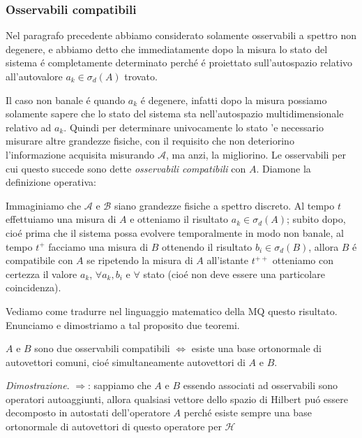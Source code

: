 \subsubsection{Osservabili compatibili}
	
Nel paragrafo precedente abbiamo considerato solamente osservabili a spettro non degenere, e abbiamo detto che immediatamente dopo la misura lo stato del sistema \'e completamente determinato perch\'e \'e proiettato sull'autospazio relativo all'autovalore $a_k \in \sigma_{d}(A)$ trovato.

Il caso non banale \'e quando $a_k$ \'e degenere, infatti dopo la misura possiamo solamente sapere che lo stato del sistema sta nell'autospazio multidimensionale relativo ad $a_k$. Quindi per determinare univocamente lo stato 'e necessario misurare altre grandezze fisiche, con il requisito che non deteriorino l'informazione acquisita misurando $\mathcal{A}$, ma anzi, la migliorino. Le osservabili per cui questo succede sono dette \textit{osservabili compatibili} con $A$. Diamone la definizione operativa:

\begin{definizione}
	Immaginiamo che $\mathcal{A}$ e $\mathcal{B}$ siano grandezze fisiche a spettro discreto. Al tempo $t$ effettuiamo una misura di $A$ e otteniamo il risultato $a_k \in \sigma_{d}(A)$; subito dopo, cio\'e prima che il sistema possa evolvere temporalmente in modo non banale, al tempo $t^+$ facciamo una misura di $B$ ottenendo il risultato $b_i \in \sigma_{d}(B)$, allora $B$ \'e compatibile con $A$ se ripetendo la misura di $A$ all'istante $t^{++}$ otteniamo con certezza il valore $a_k$, $\forall a_k, b_i$ e $\forall$ stato (cio\'e non deve essere una particolare coincidenza).
\end{definizione} 

	Vediamo come tradurre nel linguaggio matematico della MQ questo risultato. Enunciamo e dimostriamo a tal proposito due teoremi.
	
\begin{theorem}
	$A$ e $B$ sono due osservabili compatibili $\iff$ esiste una base ortonormale di autovettori comuni,
	cio\'e simultaneamente autovettori di $A$ e $B$.
\end{theorem}
	
\textit{Dimostrazione}. $\Longrightarrow$: sappiamo che $A$ e $B$ essendo associati ad osservabili sono operatori autoaggiunti, allora qualsiasi vettore dello spazio di Hilbert pu\'o essere decomposto in autostati dell'operatore $A$ perch\'e esiste sempre una base ortonormale di autovettori di questo operatore per $\mathcal{H}$

